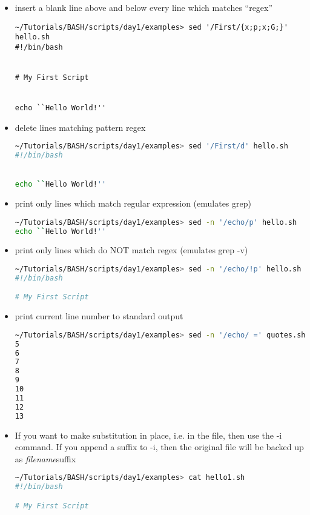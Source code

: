 \documentclass[slidestop,mathserif,compress,xcolor=svgnames]{beamer}
\begin{document}
\begin{frame}
{\begin{itemize}
\begin{lstlisting}[language=bash]
# My First Script


echo ``Hello World!''
        \end{lstlisting}
        \framebreak
      \item insert a blank line above and below every line which matches ``regex''
        \begin{lstlisting}
~/Tutorials/BASH/scripts/day1/examples> sed '/First/{x;p;x;G;}' hello.sh 
#!/bin/bash


# My First Script


echo ``Hello World!''
        \end{lstlisting}
    \item delete lines matching pattern regex
      \begin{lstlisting}[language=bash]
~/Tutorials/BASH/scripts/day1/examples> sed '/First/d' hello.sh 
#!/bin/bash


echo ``Hello World!''
      \end{lstlisting}
    \item print only lines which match regular expression (emulates grep)
      \begin{lstlisting}[language=bash]
~/Tutorials/BASH/scripts/day1/examples> sed -n '/echo/p' hello.sh
echo ``Hello World!''
      \end{lstlisting}
    \item print only lines which do NOT match regex (emulates grep -v)
      \begin{lstlisting}[language=bash]
~/Tutorials/BASH/scripts/day1/examples> sed -n '/echo/!p' hello.sh
#!/bin/bash

# My First Script

      \end{lstlisting}
    \item print current line number to standard output
      \begin{lstlisting}[language=bash]
~/Tutorials/BASH/scripts/day1/examples> sed -n '/echo/ =' quotes.sh 
5
6
7
8
9
10
11
12
13
      \end{lstlisting}
    \item If you want to make substitution in place, i.e. in the file, then use the -i command. If you append a suffix to -i, then the original file will be backed up as \textit{filename}suffix
      \begin{lstlisting}[language=bash,basicstyle=\fontsize{4}{5}\selectfont\ttfamily]
~/Tutorials/BASH/scripts/day1/examples> cat hello1.sh
#!/bin/bash

# My First Script


\end{lstlisting}
\end{itemize}}
\end{frame}
\end{document}

